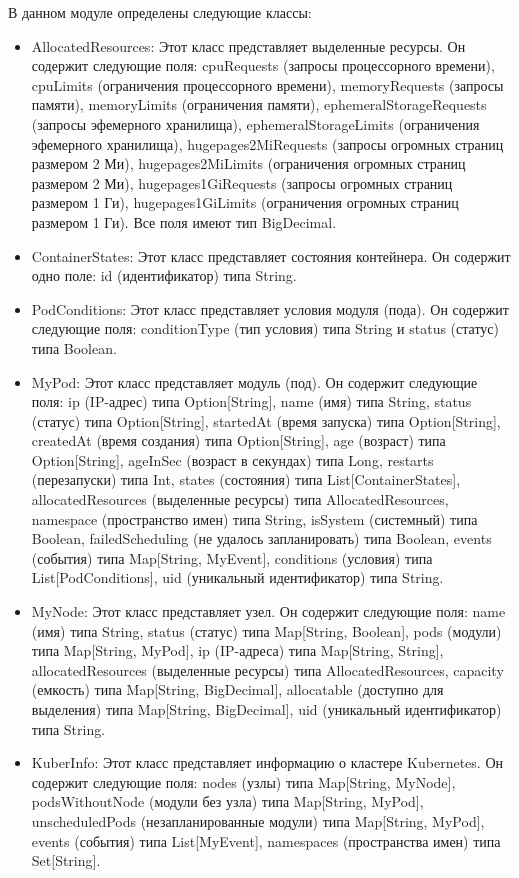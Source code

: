 В данном модуле определены следующие классы:
\begin{itemize}
  \item AllocatedResources: Этот класс представляет выделенные ресурсы. Он
содержит следующие поля: cpuRequests (запросы процессорного времени), cpuLimits
(ограничения процессорного времени), memoryRequests (запросы памяти),
memoryLimits (ограничения памяти), ephemeralStorageRequests (запросы эфемерного
хранилища), ephemeralStorageLimits (ограничения эфемерного хранилища),
hugepages2MiRequests (запросы огромных страниц размером 2 Ми),
hugepages2MiLimits (ограничения огромных страниц размером 2 Ми),
hugepages1GiRequests (запросы огромных страниц размером 1 Ги),
hugepages1GiLimits (ограничения огромных страниц размером 1 Ги). Все поля имеют
тип BigDecimal.
  
  \item ContainerStates: Этот класс представляет состояния контейнера. Он
содержит одно поле: id (идентификатор) типа String.
  
  \item PodConditions: Этот класс представляет условия модуля (пода). Он
содержит следующие поля: conditionType (тип условия) типа String и status
(статус) типа Boolean.
  
  \item MyPod: Этот класс представляет модуль (под). Он содержит следующие поля:
ip (IP-адрес) типа Option[String], name (имя) типа String, status (статус) типа
Option[String], startedAt (время запуска) типа Option[String], createdAt (время
создания) типа Option[String], age (возраст) типа Option[String], ageInSec
(возраст в секундах) типа Long, restarts (перезапуски) типа Int, states
(состояния) типа List[ContainerStates], allocatedResources (выделенные ресурсы)
типа AllocatedResources, namespace (пространство имен) типа String, isSystem
(системный) типа Boolean, failedScheduling (не удалось запланировать) типа
Boolean, events (события) типа Map[String, MyEvent], conditions (условия) типа
List[PodConditions], uid (уникальный идентификатор) типа String.
  
  \item MyNode: Этот класс представляет узел. Он содержит следующие поля: name
(имя) типа String, status (статус) типа Map[String, Boolean], pods (модули) типа
Map[String, MyPod], ip (IP-адреса) типа Map[String, String], allocatedResources
(выделенные ресурсы) типа AllocatedResources, capacity (емкость) типа
Map[String, BigDecimal], allocatable (доступно для выделения) типа Map[String,
BigDecimal], uid (уникальный идентификатор) типа String.
  
  \item KuberInfo: Этот класс представляет информацию о кластере Kubernetes. Он
содержит следующие поля: nodes (узлы) типа Map[String, MyNode], podsWithoutNode
(модули без узла) типа Map[String, MyPod], unscheduledPods (незапланированные
модули) типа Map[String, MyPod], events (события) типа List[MyEvent], namespaces
(пространства имен) типа Set[String].
  \end{itemize}
  
